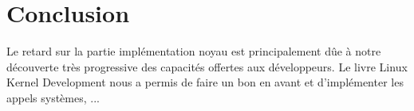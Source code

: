 \documentclass[pdftex,a4paper,titlepage,11pt,openright]{article}
\newcommand{\clearemptydoublepage}{
	\newpage{\pagestyle{empty}\cleardoublepage}}
\begin{document}
\newpage

\clearemptydoublepage

\section*{Conclusion} 



Le retard sur la partie implémentation noyau est principalement dûe à notre découverte très progressive des capacités offertes aux développeurs. Le livre Linux Kernel Development \cite{LKDSE} nous a permis de faire un bon en avant et d'implémenter les appels systèmes, ...






\newpage
{}
\end{document}
